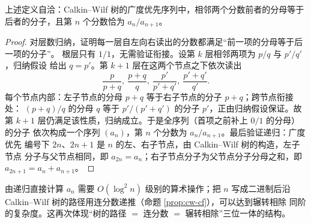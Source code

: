 \begin{proposition}
上述定义自洽：Calkin--Wilf 树的广度优先序列中，相邻两个分数前者的分母等于
后者的分子，且第 $n$ 个分数恰为 $a_n/a_{n+1}$。
\end{proposition}

\begin{proof}
对层数归纳，证明每一层自左向右读出的分数都满足``前一项的分母等于后一项的分子''。
根层只有 $1/1$，无需验证衔接。设第 $k$ 层相邻两项为 $p/q$ 与 $p'/q'$，归纳假设
给出 $q=p'$。第 $k+1$ 层在这两个节点之下依次读出
\[
  \frac{p}{p+q},\ \frac{p+q}{q},\ \frac{p'}{p'+q'},\ \frac{p'+q'}{q'}.
\]
每个节点内部：左子节点的分母 $p+q$ 等于右子节点的分子 $p+q$；跨节点衔接处：
$(p+q)/q$ 的分母 $q$ 等于 $p'/(p'+q')$ 的分子 $p'$，正由归纳假设保证。故第
$k+1$ 层仍满足该性质，归纳成立。于是全序列（首项之前补上 $0/1$ 的分母）的分子
依次构成一个序列 $(a_n)$，第 $n$ 个分数为 $a_n/a_{n+1}$。最后验证递归：广度优先
编号下 $2n$、$2n+1$ 是 $n$ 的左、右子节点，由 Calkin--Wilf 树的构造，左子节点
分子与父节点相同，即 $a_{2n}=a_n$；右子节点分子为父节点分子分母之和，即
$a_{2n+1}=a_n+a_{n+1}$。
\end{proof}

\begin{remark}
由递归直接计算 $a_n$ 需要 $O(\log^2 n)$ 级别的算术操作；把 $n$ 写成二进制后沿
Calkin--Wilf 树的路径用连分数递推（命题 \ref{prop:cw-cf}），可以达到辗转相除
同阶的复杂度。这再次体现``树的路径 $=$ 连分数 $=$ 辗转相除''三位一体的结构。
\end{remark}
